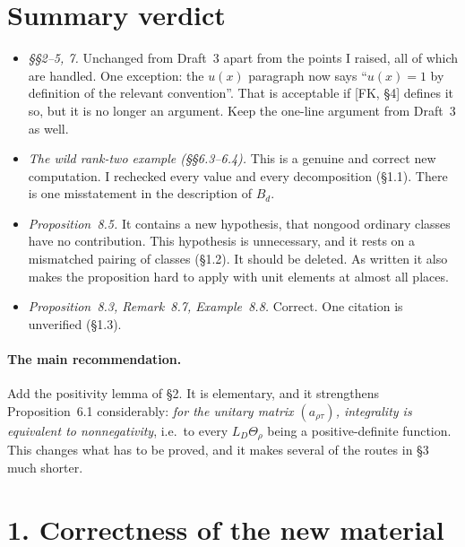 \documentclass[11pt]{article}
\theoremstyle{plain}
\begin{document}
\section*{Summary verdict}
\begin{itemize}
\item \emph{\S\S2--5, 7.} Unchanged from Draft~3 apart from
the points I raised, all of which are handled. One exception: the
$u(x)$ paragraph now says ``$u(x)=1$ by definition of the relevant
convention''. That is acceptable if [FK, \S4] defines it so, but it is
no longer an argument. Keep the one-line argument from Draft~3 as well.
\item \emph{The wild rank-two example (\S\S6.3--6.4).} This is a genuine
and correct new computation. I rechecked every value and every
decomposition (\S1.1). There is one misstatement in the description of
$B_d$.
\item \emph{Proposition~8.5.} It contains a new hypothesis, that
nongood ordinary classes have no contribution. This hypothesis is
unnecessary, and it rests on a mismatched pairing of classes (\S1.2).
It should be deleted. As written it also makes the proposition hard to
apply with unit elements at almost all places.
\item \emph{Proposition~8.3, Remark~8.7, Example~8.8.} Correct. One
citation is unverified (\S1.3).
\end{itemize}

\paragraph{The main recommendation.} Add the positivity lemma of \S2.
It is elementary, and it strengthens Proposition~6.1 considerably:
\emph{for the unitary matrix $(a_{\rho\tau})$, integrality is
equivalent to nonnegativity}, i.e.\ to every $L_D\Theta_\rho$ being a
positive-definite function. This changes what has to be proved, and it
makes several of the routes in \S3 much shorter.

\section*{1. Correctness of the new material}
\end{document}
